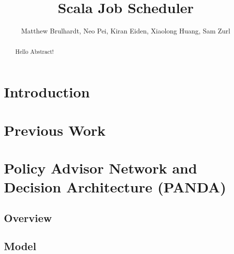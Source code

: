 \documentclass{article}
\title{Scala Job Scheduler}
\author{Matthew Brulhardt, Neo Pei, Kiran Eiden, Xiaolong Huang, Sam Zurl}
\begin{document}
	\maketitle

	\begin{abstract}
		Hello Abstract!
	\end{abstract}

	\section{Introduction}

	\section{Previous Work}


	\section{Policy Advisor Network and Decision Architecture (PANDA)}



	\subsection{Overview}

	\subsection{Model}

\end{document}
